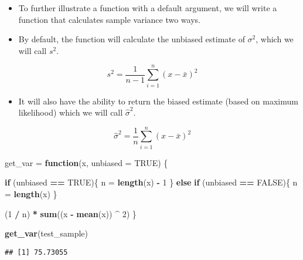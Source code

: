 \documentclass[]{book}
\newenvironment{Shaded}{\begin{snugshade}}{\end{snugshade}}
\newcommand{\ControlFlowTok}[1]{\textcolor[rgb]{0.13,0.29,0.53}{\textbf{#1}}}
\newcommand{\DataTypeTok}[1]{\textcolor[rgb]{0.13,0.29,0.53}{#1}}
\newcommand{\DecValTok}[1]{\textcolor[rgb]{0.00,0.00,0.81}{#1}}
\newcommand{\KeywordTok}[1]{\textcolor[rgb]{0.13,0.29,0.53}{\textbf{#1}}}
\newcommand{\NormalTok}[1]{#1}
\newcommand{\OperatorTok}[1]{\textcolor[rgb]{0.81,0.36,0.00}{\textbf{#1}}}
\newcommand{\OtherTok}[1]{\textcolor[rgb]{0.56,0.35,0.01}{#1}}
\newcommand{\StringTok}[1]{\textcolor[rgb]{0.31,0.60,0.02}{#1}}
\providecommand{\tightlist}{%
  \setlength{\itemsep}{0pt}\setlength{\parskip}{0pt}}
\begin{document}
\begin{itemize}
\item
  To further illustrate a function with a default argument, we will write a function that calculates sample variance two ways.
\item
  By default, the function will calculate the unbiased estimate of \(\sigma^2\), which we will call \(s^2\).
\end{itemize}

\[
s^2 = \frac{1}{n - 1}\sum_{i=1}^{n}(x - \bar{x})^2
\]

\begin{itemize}
\tightlist
\item
  It will also have the ability to return the biased estimate (based on maximum likelihood) which we will call \(\hat{\sigma}^2\).
\end{itemize}

\[
\hat{\sigma}^2 = \frac{1}{n}\sum_{i=1}^{n}(x - \bar{x})^2
\]

\begin{Shaded}
\begin{Highlighting}[]
\NormalTok{get_var =}\StringTok{ }\ControlFlowTok{function}\NormalTok{(x, }\DataTypeTok{unbiased =} \OtherTok{TRUE}\NormalTok{) \{}

  \ControlFlowTok{if}\NormalTok{ (unbiased }\OperatorTok{==}\StringTok{ }\OtherTok{TRUE}\NormalTok{)\{}
\NormalTok{    n =}\StringTok{ }\KeywordTok{length}\NormalTok{(x) }\OperatorTok{-}\StringTok{ }\DecValTok{1}
\NormalTok{  \} }\ControlFlowTok{else} \ControlFlowTok{if}\NormalTok{ (unbiased }\OperatorTok{==}\StringTok{ }\OtherTok{FALSE}\NormalTok{)\{}
\NormalTok{    n =}\StringTok{ }\KeywordTok{length}\NormalTok{(x) }
\NormalTok{   \}}

\NormalTok{  (}\DecValTok{1} \OperatorTok{/}\StringTok{ }\NormalTok{n) }\OperatorTok{*}\StringTok{ }\KeywordTok{sum}\NormalTok{((x }\OperatorTok{-}\StringTok{ }\KeywordTok{mean}\NormalTok{(x)) }\OperatorTok{^}\StringTok{ }\DecValTok{2}\NormalTok{)}
\NormalTok{\}}
\end{Highlighting}
\end{Shaded}

\begin{Shaded}
\begin{Highlighting}[]
\KeywordTok{get_var}\NormalTok{(test_sample)}
\end{Highlighting}
\end{Shaded}

\begin{verbatim}
## [1] 75.73055
\end{verbatim}
\end{document}
